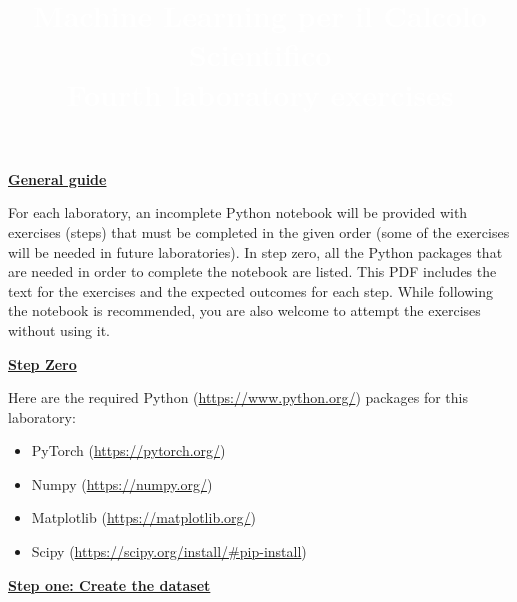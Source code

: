 \documentclass{article}
\title{\textcolor{white}{\textbf{Machine Learning per il Calcolo Scientifico}\\ \small\textbf{Fourth laboratory exercises }}}
\date{}
\newcommand{\step}[1]{\underline{\textbf{\large{#1}}} }
\begin{document}
    \AddToShipoutPicture*
    {%
      \AtPageUpperLeft
        {%
          \color{bluunipv}%
          \raisebox{-.1\paperheight}{\rule{\paperwidth}{.5\paperheight}}%

        }%
    }

    \maketitle

    \begin{center}\step{General guide} \end{center}
    \noindent
    For each laboratory, an incomplete Python notebook will be provided with exercises (steps) that must be completed in the given order (some of the exercises will be needed in future laboratories). In step zero, all the Python packages that are needed in order to complete the notebook are listed. This PDF includes the text for the exercises and the expected outcomes for each step. While following the notebook is recommended, you are also welcome to attempt the exercises without using it.

    \begin{center}\step{Step Zero} \end{center}

    Here are the required Python (\url{https://www.python.org/}) packages for this laboratory:
    \begin{itemize}
      \item PyTorch (\url{https://pytorch.org/})
      \item Numpy (\url{https://numpy.org/})
      \item Matplotlib (\url{https://matplotlib.org/})
      \item[\textcolor{red}{\textbullet}] Scipy (\url{https://scipy.org/install/#pip-install})
    \end{itemize}

    \begin{center}\step{Step one: Create the dataset}\end{center}
\end{document}
